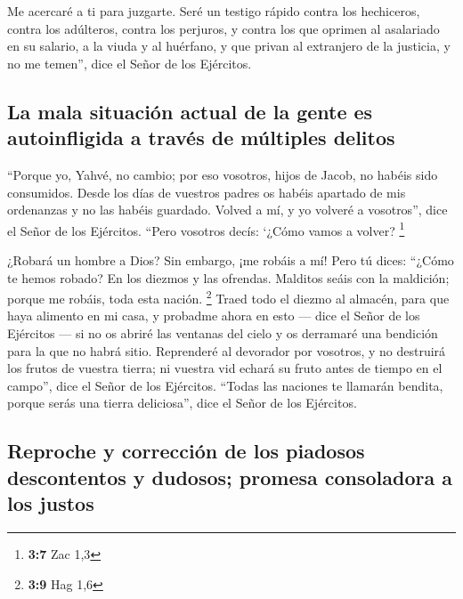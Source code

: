  Me acercaré a ti para juzgarte. Seré un testigo rápido
contra los hechiceros, contra los adúlteros, contra los perjuros, y
contra los que oprimen al asalariado en su salario, a la viuda y al
huérfano, y que privan al extranjero de la justicia, y no me temen'',
dice el Señor de los Ejércitos.

\hypertarget{la-mala-situaciuxf3n-actual-de-la-gente-es-autoinfligida-a-travuxe9s-de-muxfaltiples-delitos}{%
\subsection{La mala situación actual de la gente es autoinfligida a
través de múltiples
delitos}\label{la-mala-situaciuxf3n-actual-de-la-gente-es-autoinfligida-a-travuxe9s-de-muxfaltiples-delitos}}

 ``Porque yo, Yahvé, no cambio; por eso vosotros, hijos de
Jacob, no habéis sido consumidos.  Desde los días de
vuestros padres os habéis apartado de mis ordenanzas y no las habéis
guardado. Volved a mí, y yo volveré a vosotros'', dice el Señor de los
Ejércitos. ``Pero vosotros decís: `¿Cómo vamos a volver? \footnote{\textbf{3:7}
  Zac 1,3}

 ¿Robará un hombre a Dios? Sin embargo, ¡me robáis a mí!
Pero tú dices: ``¿Cómo te hemos robado? En los diezmos y las ofrendas.
 Malditos seáis con la maldición; porque me robáis, toda
esta nación. \footnote{\textbf{3:9} Hag 1,6}  Traed todo
el diezmo al almacén, para que haya alimento en mi casa, y probadme
ahora en esto --- dice el Señor de los Ejércitos --- si no os abriré las
ventanas del cielo y os derramaré una bendición para la que no habrá
sitio.  Reprenderé al devorador por vosotros, y no
destruirá los frutos de vuestra tierra; ni vuestra vid echará su fruto
antes de tiempo en el campo'', dice el Señor de los Ejércitos.
 ``Todas las naciones te llamarán bendita, porque serás
una tierra deliciosa'', dice el Señor de los Ejércitos.

\hypertarget{reproche-y-correcciuxf3n-de-los-piadosos-descontentos-y-dudosos-promesa-consoladora-a-los-justos}{%
\subsection{Reproche y corrección de los piadosos descontentos y
dudosos; promesa consoladora a los
justos}\label{reproche-y-correcciuxf3n-de-los-piadosos-descontentos-y-dudosos-promesa-consoladora-a-los-justos}}

